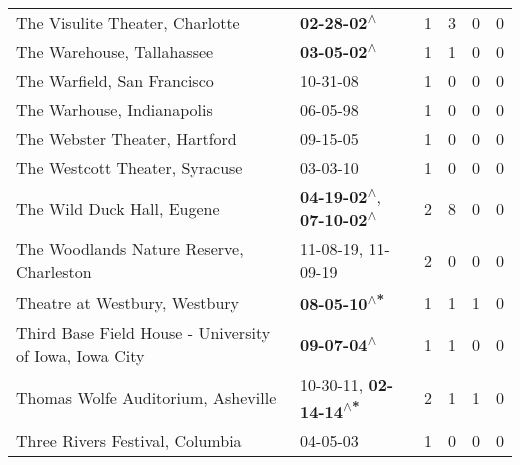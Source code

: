\begin{supertabular}{p{0.4\textwidth}p{0.3\textwidth}p{0.05\textwidth}p{0.05\textwidth}p{0.05\textwidth}p{0.05\textwidth}}
                                              The Visulite Theater, Charlotte &                                                 \textbf{02-28-02\textsuperscript{$\wedge$}} &  1 &  3 &  0 &  0 \\
                                                   The Warehouse, Tallahassee &                                                 \textbf{03-05-02\textsuperscript{$\wedge$}} &  1 &  1 &  0 &  0 \\
                                                  The Warfield, San Francisco &                                                                  10-31-08\textsuperscript{} &  1 &  0 &  0 &  0 \\
                                                   The Warhouse, Indianapolis &                                                                  06-05-98\textsuperscript{} &  1 &  0 &  0 &  0 \\
                                                The Webster Theater, Hartford &                                                                  09-15-05\textsuperscript{} &  1 &  0 &  0 &  0 \\
                                               The Westcott Theater, Syracuse &                                                                  03-03-10\textsuperscript{} &  1 &  0 &  0 &  0 \\
                                                   The Wild Duck Hall, Eugene &    \textbf{04-19-02\textsuperscript{$\wedge$}}, \textbf{07-10-02\textsuperscript{$\wedge$}} &  2 &  8 &  0 &  0 \\
                                     The Woodlands Nature Reserve, Charleston &                                      11-08-19\textsuperscript{}, 11-09-19\textsuperscript{} &  2 &  0 &  0 &  0 \\
                                                Theatre at Westbury, Westbury &                                                \textbf{08-05-10\textsuperscript{$\wedge$*}} &  1 &  1 &  1 &  0 \\
                       Third Base Field House - University of Iowa, Iowa City &                                                 \textbf{09-07-04\textsuperscript{$\wedge$}} &  1 &  1 &  0 &  0 \\
                                           Thomas Wolfe Auditorium, Asheville &                    10-30-11\textsuperscript{}, \textbf{02-14-14\textsuperscript{$\wedge$*}} &  2 &  1 &  1 &  0 \\
                                              Three Rivers Festival, Columbia &                                                                  04-05-03\textsuperscript{} &  1 &  0 &  0 &  0 \\

\end{supertabular}
